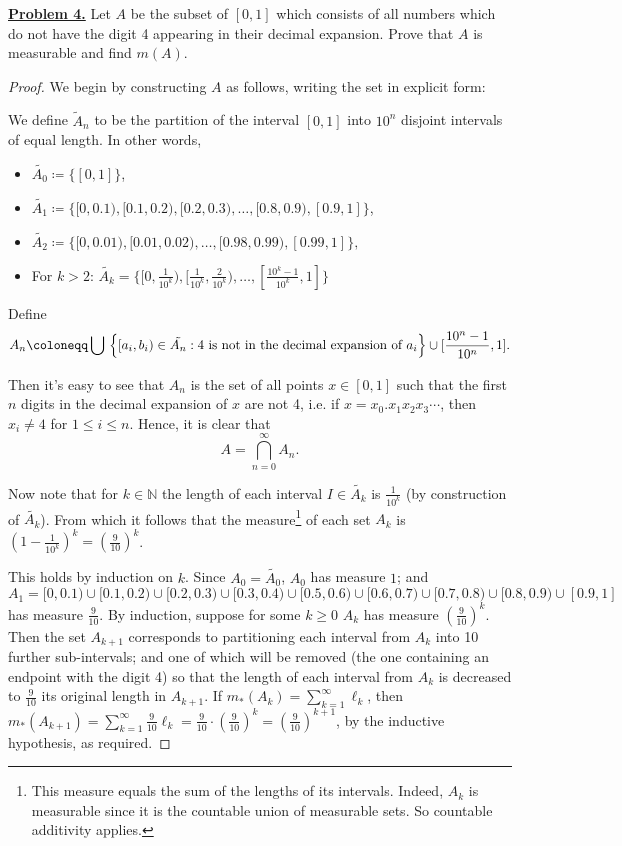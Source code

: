 \noindent \underline{\textbf{Problem 4.}} Let $A$ be the subset of $[0,1]$ which consists of all numbers which do not have the digit 4 appearing in their decimal expansion. Prove that $A$ is measurable and find $m(A)$.
\begin{proof}
We begin by constructing \( A \) as follows, writing the set in explicit form:

We define \( \tilde{A}_n \) to be the partition of the interval \( [0,1] \) into \( 10^{n}  \) disjoint intervals of equal length. In other words,
\begin{itemize}
	\item \( \tilde{A_0} \coloneqq \{[0,1]\} \),
	\item \(\tilde{A_1} \coloneqq \{[0, 0.1), [0.1, 0.2) , [0.2, 0.3) , \hdots , [0.8, 0.9) , [0.9, 1] \} \),
	\item \(\tilde{A_2} \coloneqq \{ [0, 0.01) , [0.01, 0.02) , \hdots , [0.98, 0.99) , [0.99, 1]\},  \)
	\item For \( k > 2 \): \( \tilde{A_k} = \{ [0, \frac{1}{10^{k}}), [\frac{1}{10^{k} }, \frac{2}{10^{k} }), \hdots , [ \frac{10^{k} - 1 }{10^{k} }  ,1]   \}  \) 
\end{itemize}
Define \[ A_n \coloneqq \bigcup_{}^{} \  \Bigl \{ [a_i, b_i) \in  \tilde{A_n} : \mbox{4 is not in the decimal expansion of \( a_i \)} \Bigr \} \cup [\frac{10^{n}-1}{10^{n} } , 1]. \] Then it's easy to see that \( A_n \) is the set of all points \( x \in [0,1] \) such that the first \( n \) digits in the decimal expansion of \( x \) are not 4, i.e. if \( x = x_0. x_1x_2x_3\cdots  \), then \( x_i \neq 4 \) for \( 1 \leq i \leq n \). 
Hence, it is clear that \[A = \bigcap_{n=0}^{\infty} A_n.\]  

Now note that for \( k \in \mathbb{N}  \) the length of each interval \( I \in \tilde{A_k}\) is \( \frac{1}{10^{k} }  \) (by construction of \( \tilde{A_k}  \)).
From which it follows that the measure\footnote{This measure equals the sum of the lengths of its intervals. Indeed, \( A_k \) is measurable since it is the countable union of measurable sets. So countable additivity applies.} of each set \( A_k \) is \( (1 - \frac{1}{10^{k} })^{k} = \left ( {\frac{9}{10} } \right )^{k}     \).


This holds by induction on \( k \). Since \( A_0 = \tilde{A_0}  \), \( A_0\) has measure \(1 \); and \( A_1 = [0, 0.1) \cup [0.1, 0.2) \cup [0.2, 0.3) \cup [0.3, 0.4) \cup [0.5, 0.6) \cup [0.6 , 0.7) \cup [0.7, 0.8) \cup [0.8, 0.9) \cup [0.9, 1]  \) has measure \( \frac{9}{10}.  \) By induction, suppose for some \( k \geq 0 \) 	\( A_k \) has measure \( (\frac{9}{10})^{k}   \). Then the set \( A_{k+1}  \) corresponds to partitioning each interval from \( A_k \) into 10 further sub-intervals; and one of which will be removed (the one containing an endpoint with the digit 4) so that the length of each interval from \( A_k \) is decreased to \( \frac{9}{10}  \) its original length in \( A_{k+1}  \). If \( m_*(A_k) = \sum_{k=1}^{\infty}\ell_k  \), then \( m_*(A_{k+1} ) = \sum_{k=1}^{\infty}\frac{9}{10}\ell_k = \frac{9}{10} \cdot (\frac{9}{10} 	)^{k} = (\frac{9}{10} )^{k+1}    \), by the inductive hypothesis, as required.



\end{proof}
